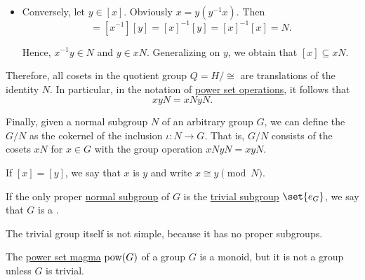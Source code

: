 \begin{definition}
\begin{thmenum}
\begin{itemize}
      \item Conversely, let \( y \in [x] \). Obviously \( x = y (y^{-1} x) \). Then
      \begin{equation*}
        [x^{-1} y] = [x^{-1}] [y] = [x]^{-1} [y] = [x]^{-1} [x] = N.
      \end{equation*}

      Hence, \( x^{-1} y \in N \) and \( y \in xN \). Generalizing on \( y \), we obtain that \( [x] \subseteq xN \).
    \end{itemize}

    Therefore, all cosets in the quotient group \( Q = H / {\cong} \) are translations of the identity \( N \). In particular, in the notation of \hyperref[def:magma/powet_set]{power set operations}, it follows that
    \begin{equation*}
      xyN = xN yN.
    \end{equation*}

    Finally, given a normal subgroup \( N \) of an arbitrary group \( G \), we can define the  \( G / N \) as the cokernel of the inclusion \( \iota: N \to G \). That is, \( G / N \) consists of the cosets \( xN \) for \( x \in G \) with the group operation \( xN yN = xyN \).

    If \( [x] = [y] \), we say that \( x \) is  \( y \) and write \( x \cong y \pmod N \).

     If the only proper \hyperref[thm:normal_subgroup_equivalences]{normal subgroup} of \( G \) is the \hyperref[def:group/trivial]{trivial subgroup} \( \set{ e_G } \), we say that \( G \) is a .

    The trivial group itself is not simple, because it has no proper subgroups.
  \end{thmenum}
\end{definition}

\begin{example}\label{ex:power_set_is_not_a_group}
  The \hyperref[def:magma/power_set]{power set magma} \( \operatorname{pow}(G) \) of a group \( G \) is a monoid, but it is not a group unless \( G \) is trivial.
\end{example}

